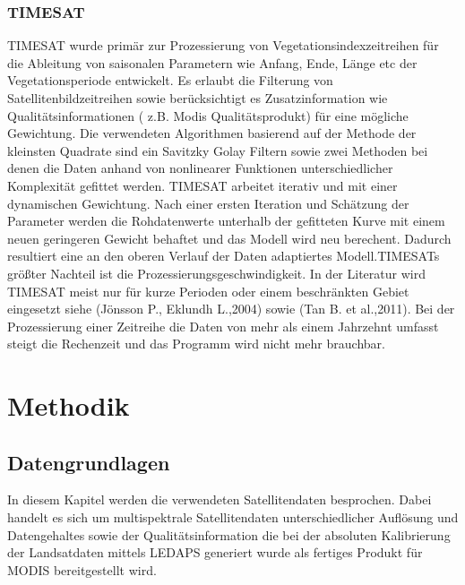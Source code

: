 \documentclass[11pt]{report}
\begin{document}
\subsection{TIMESAT}
TIMESAT wurde primär zur Prozessierung von Vegetationsindexzeitreihen für die  Ableitung von saisonalen Parametern wie Anfang, Ende, Länge etc der Vegetationsperiode entwickelt. Es erlaubt die Filterung von Satellitenbildzeitreihen sowie berücksichtigt es Zusatzinformation wie Qualitätsinformationen ( z.B. Modis Qualitätsprodukt) für eine mögliche Gewichtung. Die verwendeten Algorithmen basierend auf der Methode der kleinsten Quadrate sind ein Savitzky Golay Filtern sowie zwei Methoden bei denen die Daten anhand von nonlinearer Funktionen unterschiedlicher Komplexität gefittet werden. TIMESAT arbeitet iterativ und mit einer dynamischen Gewichtung. Nach einer ersten Iteration und Schätzung der Parameter werden die Rohdatenwerte unterhalb der gefitteten Kurve mit einem neuen geringeren Gewicht behaftet und das Modell wird neu berechent. Dadurch resultiert eine an den oberen Verlauf der Daten adaptiertes Modell.TIMESATs größter Nachteil ist die Prozessierungsgeschwindigkeit. In der Literatur wird TIMESAT meist nur für kurze Perioden oder einem beschränkten Gebiet eingesetzt siehe (Jönsson P., Eklundh L.,2004) sowie (Tan B. et al.,2011). Bei der Prozessierung einer Zeitreihe die Daten von mehr als einem Jahrzehnt umfasst steigt die Rechenzeit und das Programm wird nicht mehr brauchbar. 


% 




\chapter{Methodik}

\section{Datengrundlagen}
In diesem Kapitel werden die verwendeten Satellitendaten besprochen. Dabei handelt es sich um multispektrale Satellitendaten unterschiedlicher Auflösung und Datengehaltes  sowie der Qualitätsinformation die bei der absoluten Kalibrierung der Landsatdaten mittels LEDAPS generiert wurde als fertiges Produkt für MODIS bereitgestellt wird. 
\end{document}
